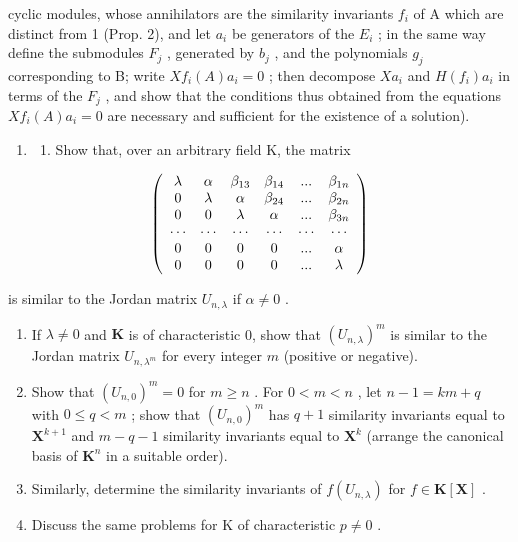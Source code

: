 cyclic modules, whose annihilators are the similarity invariants \(f_{i}\) of A which are distinct from 1 (Prop. 2), and let \(a_{i}\) be generators of the \(E_{i}\) ; in the same way define the submodules \(F_{j}\) , generated by \(b_{j}\) , and the polynomials \(g_{j}\) corresponding to B; write \(Xf_{i}(A)a_{i}=0\) ; then decompose \(Xa_{i}\) and \(H(f_{i})a_{i}\) in terms of the \(F_{j}\) , and show that the conditions thus obtained from the equations \(Xf_{i}(A)a_{i}=0\) are necessary and sufficient for the existence of a solution).

\begin{enumerate}
\def\labelenumi{\arabic{enumi})}
\setcounter{enumi}{9}
\tightlist
\item
  \begin{enumerate}
  \def\labelenumii{\alph{enumii})}
  \tightlist
  \item
    Show that, over an arbitrary field K, the matrix
  \end{enumerate}
\end{enumerate}

\[
\left( \begin{array}{c c c c c c} \lambda & \alpha & \beta_ {13} & \beta_ {14} & ... & \beta_ {1n} \\ 0 & \lambda & \alpha & \beta_ {24} & ... & \beta_ {2n} \\ 0 & 0 & \lambda & \alpha & ... & \beta_ {3n} \\ \cdots & \cdots & \cdots & \cdots & \cdots & \cdots \\ 0 & 0 & 0 & 0 & ... & \alpha \\ 0 & 0 & 0 & 0 & ... & \lambda \end{array} \right)
\]

is similar to the Jordan matrix \(U_{n,\lambda}\) if \(\alpha \neq 0\) .

\begin{enumerate}
\def\labelenumi{\alph{enumi})}
\setcounter{enumi}{1}
\item
  If \(\lambda \neq 0\) and \(\mathbf{K}\) is of characteristic 0, show that \((U_{n,\lambda})^m\) is similar to the Jordan matrix \(U_{n,\lambda^m}\) for every integer \(m\) (positive or negative).
\item
  Show that \((U_{n,0})^m = 0\) for \(m \geqslant n\) . For \(0 < m < n\) , let \(n - 1 = km + q\) with \(0 \leqslant q < m\) ; show that \((U_{n,0})^m\) has \(q + 1\) similarity invariants equal to \(\mathbf{X}^{k+1}\) and \(m - q - 1\) similarity invariants equal to \(\mathbf{X}^k\) (arrange the canonical basis of \(\mathbf{K}^n\) in a suitable order).
\item
  Similarly, determine the similarity invariants of \(f(U_{n,\lambda})\) for \(f \in \mathbf{K}[\mathbf{X}]\) .
\item
  Discuss the same problems for K of characteristic \(p \neq 0\) .
\end{enumerate}

